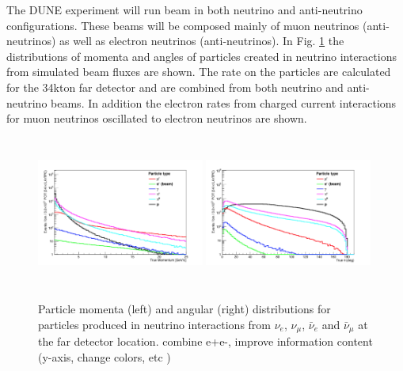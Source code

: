 The DUNE experiment will run beam in both neutrino and anti-neutrino 
configurations. These beams will be composed  mainly of muon neutrinos (anti-neutrinos) as well as electron neutrinos (anti-neutrinos). In Fig. \ref{fig:particle_momenta} the distributions of momenta and angles of particles created in neutrino interactions from simulated beam fluxes are shown. The rate on the particles are calculated for the 34kton far detector and  are combined from both neutrino and anti-neutrino beams. In addition the electron rates from charged current interactions for muon neutrinos oscillated to electron neutrinos are shown. 
\begin{figure}[h!]
  \centering
\includegraphics[width=0.49\textwidth,height=5.0cm]{figures/True_Momenta_per_Particle_9_2_1_0_log}
\includegraphics[width=0.49\textwidth,height=5.0cm]{figures/True_theta_per_Particle_9_2_1_0_lin}
  \caption{Particle momenta (left) and angular (right) distributions for particles produced in neutrino interactions 
from $\nu_e$, $\nu_\mu$, $\bar \nu_e$ and $\bar \nu_\mu$ at the far detector location.
{\color{red}  combine e+e-, improve information content (y-axis, change colors, etc )
}
}
\label{fig:particle_momenta}
\end{figure}



